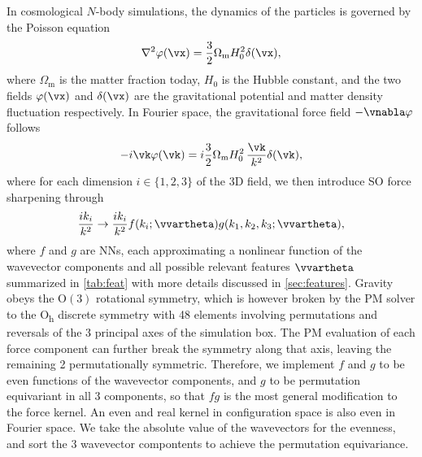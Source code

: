 \documentclass[modern, trackchanges, dvipsnames]{aastex631}
\newcommand{\Omegam}{\Omega_\mathrm{m}}
\begin{document}
In cosmological $N$-body simulations, the dynamics of the particles is
governed by the Poisson equation
%
\begin{equation}
  \nabla^2 \varphi(\vx) = \frac32 \Omegam H_0^2 \delta(\vx),
\end{equation}
%
where $\Omegam$ is the matter fraction today, $H_0$ is the Hubble
constant, and the two fields $\varphi(\vx)$ and $\delta(\vx)$ are the
gravitational potential and matter density fluctuation respectively.
In Fourier space, the gravitational force field $- \vnabla \varphi$
follows
%
\begin{equation}
- i \vk \varphi(\vk) = i \frac32 \Omegam H_0^2 \,\frac{\vk}{k^2} \delta(\vk),
\end{equation}
%
where for each dimension $i\in\{1,2,3\}$ of the 3D field, we then
introduce SO force sharpening through
%
\begin{equation}
\frac{i k_i}{k^2} \to \frac{i k_i}{k^2}
  f(k_i; \vvartheta) g(k_1, k_2, k_3; \vvartheta),
\end{equation}
%
where $f$ and $g$ are NNs, each approximating a nonlinear function of
the wavevector components and all possible relevant features
$\vvartheta$ summarized in \autoref{tab:feat} with more details
discussed in \autoref{sec:features}.
Gravity obeys the $\mathrm{O}(3)$ rotational symmetry, which is however
broken by the PM solver to the O\textsubscript{h} discrete symmetry with
48 elements involving permutations and reversals of the 3 principal axes
of the simulation box.
The PM evaluation of each force component can further break the symmetry
along that axis, leaving the remaining 2 permutationally symmetric.
Therefore, we implement $f$ and $g$ to be even functions of the
wavevector components, and $g$ to be permutation equivariant in all 3
components, so that $f g$ is the most general modification to the force
kernel.
An even and real kernel in configuration space is also even in Fourier
space.
We take the absolute value of the wavevectors for the evenness, and sort
the 3 wavevector compontents to achieve the permutation equivariance.
\end{document}

